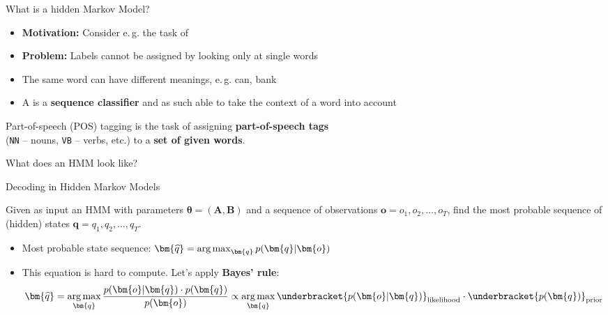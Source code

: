 \begin{frame}{What is a hidden Markov Model?}{}
	\begin{itemize}
		\item \textbf{Motivation:} Consider e.\,g. the task of 
		\item \textbf{Problem:} Labels cannot be assigned by looking only at single words
		\item {} The same word can have different meanings, e.\,g. can, bank
		\item A  is a \textbf{sequence classifier} and as such able to take the
			context of a word into account
	\end{itemize}

	\vspace*{3mm}
	\begin{boxBlueNoFrame}
		\footnotesize
		Part-of-speech (POS) tagging is the task of assigning \textbf{part-of-speech tags} \\
			(\texttt{NN} -- nouns, \texttt{VB} -- verbs, etc.) to a \textbf{set of given words}.
	\end{boxBlueNoFrame}
\end{frame}


\begin{frame}{What does an HMM look like?}{}
	
\end{frame}


\begin{frame}{Decoding in Hidden Markov Models}{}
	\begin{boxBlueNoFrame}
		 Given as input an HMM with parameters $\bm{\theta} = (\bm{A}, \bm{B})$ and a sequence of
		observations $\bm{o} = o_1, o_2, \dots, o_T$, find the most probable sequence of (hidden) states
		$\bm{q} = q_1, q_2, \dots, q_T$.
	\end{boxBlueNoFrame}

	\begin{itemize}
		\item Most probable state sequence: $\bm{\widehat{q}} = \argmax_{\bm{q}} p(\bm{q} \vert \bm{o})$
		\item This equation is hard to compute. Let's apply \textbf{Bayes' rule}:
		\begin{equation}
			\bm{\widehat{q}} = \argmax_{\bm{q}} \frac{p(\bm{o} \vert \bm{q}) \cdot p(\bm{q})}{p(\bm{o})}
				\propto \argmax_{\bm{q}} \underbracket{p(\bm{o} \vert \bm{q})}_{\text{likelihood}} \cdot
				\underbracket{p(\bm{q})}_{\text{prior}}
		\end{equation}
	\end{itemize}
\end{frame}


